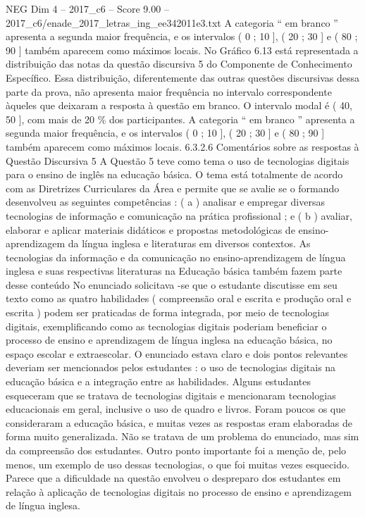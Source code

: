 \begin{textsample}{NEG Dim 4 – 2017\_c6 – Score 9.00 – 2017\_c6/enade\_2017\_letras\_ing\_ee342011e3.txt}
A categoria “ em branco ” apresenta a segunda maior frequência, e os intervalos ( 0 ; 10 ], ( 20 ; 30 ] e ( 80 ; 90 ] também aparecem como máximos locais.
No Gráfico 6.13 está representada a distribuição das notas da questão discursiva 5 do Componente de Conhecimento Específico.
Essa distribuição, diferentemente das outras questões discursivas dessa parte da prova, não apresenta maior frequência no intervalo correspondente àqueles que deixaram a resposta à questão em branco.
O intervalo modal é ( 40, 50 ], com mais de 20 \% dos participantes.
A categoria “ em branco ” apresenta a segunda maior frequência, e os intervalos ( 0 ; 10 ], ( 20 ; 30 ] e ( 80 ; 90 ] também aparecem como máximos locais. 6.3.2.6 Comentários sobre as respostas à Questão Discursiva 5 A Questão 5 teve como tema o uso de tecnologias digitais para o ensino de inglês na educação básica.
O tema está totalmente de acordo com as Diretrizes Curriculares da Área e permite que se avalie se o formando desenvolveu as seguintes competências : ( a ) analisar e empregar diversas tecnologias de informação e comunicação na prática profissional ; e ( b ) avaliar, elaborar e aplicar materiais didáticos e propostas metodológicas de ensino-aprendizagem da língua inglesa e literaturas em diversos contextos.
As tecnologias da informação e da comunicação no ensino-aprendizagem de língua inglesa e suas respectivas literaturas na Educação básica também fazem parte desse conteúdo No enunciado solicitava -se que o estudante discutisse em seu texto como as quatro habilidades ( compreensão oral e escrita e produção oral e escrita ) podem ser praticadas de forma integrada, por meio de tecnologias digitais, exemplificando como as tecnologias digitais poderiam beneficiar o processo de ensino e aprendizagem de língua inglesa na educação básica, no espaço escolar e extraescolar.
O enunciado estava claro e dois pontos relevantes deveriam ser mencionados pelos estudantes : o uso de tecnologias digitais na educação básica e a integração entre as habilidades.
Alguns estudantes esqueceram que se tratava de tecnologias digitais e mencionaram tecnologias educacionais em geral, inclusive o uso de quadro e livros.
Foram poucos os que consideraram a educação básica, e muitas vezes as respostas eram elaboradas de forma muito generalizada.
Não se tratava de um problema do enunciado, mas sim da compreensão dos estudantes.
Outro ponto importante foi a menção de, pelo menos, um exemplo de uso dessas tecnologias, o que foi muitas vezes esquecido.
Parece que a dificuldade na questão envolveu o despreparo dos estudantes em relação à aplicação de tecnologias digitais no processo de ensino e aprendizagem de língua inglesa.

\end{textsample}
